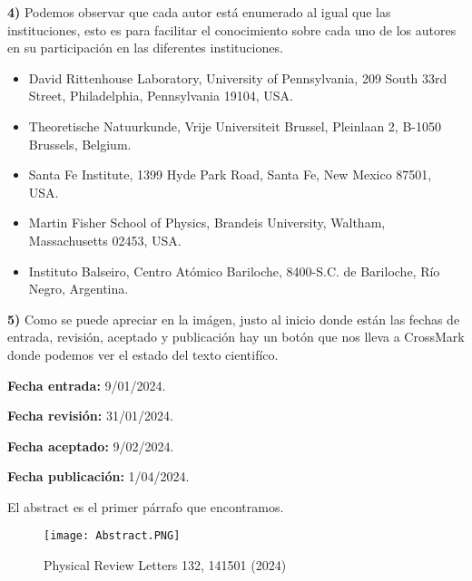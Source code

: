 \documentclass[letterpaper]{article}
\begin{document}
\begin{justify}

\textbf{4)} Podemos observar que cada autor está enumerado al igual que
las instituciones, esto es para facilitar el conocimiento sobre cada uno de los autores en
su participación en las diferentes instituciones.

\begin{itemize}
    \item David Rittenhouse Laboratory, University of Pennsylvania, 209 South 33rd Street, Philadelphia, Pennsylvania 19104, USA.
    \item Theoretische Natuurkunde, Vrije Universiteit Brussel, Pleinlaan 2, B-1050 Brussels, Belgium.
    \item Santa Fe Institute, 1399 Hyde Park Road, Santa Fe, New Mexico 87501, USA.
    \item Martin Fisher School of Physics, Brandeis University, Waltham, Massachusetts 02453, USA.
    \item Instituto Balseiro, Centro Atómico Bariloche, 8400-S.C. de Bariloche, Río Negro, Argentina.
\end{itemize}
\end{justify}

\vspace{\baselineskip}

\begin{justify}
\textbf{5)} Como se puede apreciar en la imágen, justo al inicio donde están las fechas
de entrada, revisión, aceptado y publicación hay un botón que nos lleva a CrossMark
donde podemos ver el estado del texto cientifíco.

\begin{multicols}{2}
\textbf{Fecha  entrada:} 9/01/2024.

\textbf{Fecha  revisión:} 31/01/2024. 
\end{multicols}

\begin{multicols}{2}
    \textbf{Fecha aceptado:} 9/02/2024.
    
    \textbf{Fecha publicación:} 1/04/2024. 
\end{multicols}
\end{justify}

\newpage
\begin{justify}

El abstract es el primer párrafo que encontramos.

\begin{figure}[h]
    \centering
    \texttt{[image: Abstract.PNG]}
    \caption{ Physical Review Letters 132, 141501 (2024)  }
    
\end{figure}
\end{justify}
\end{document}
